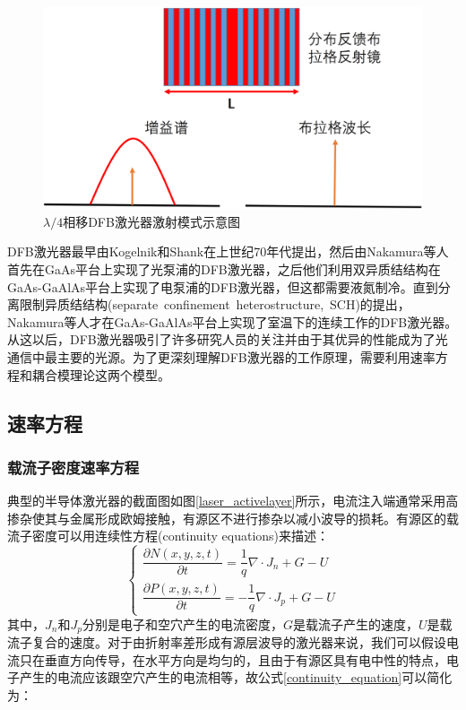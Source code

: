\begin{figure}[htb]
	\centering
	\includegraphics[width=12cm]{./Pictures/fab_dfb_laser.jpg}
	\captionsetup{justification=centering}
	\caption{$\lambda/4$相移DFB激光器激射模式示意图}
	\label{fab_dfb_laser}
\end{figure}

DFB激光器最早由Kogelnik和Shank在上世纪70年代提出\cite{kogelnik1971stimulated,kogelnik1972coupled}，然后由Nakamura等人首先在GaAs平台上实现了光泵浦的DFB激光器\cite{nakamura1973optically}，之后他们利用双异质结结构在GaAs-GaAlAs平台上实现了电泵浦的DFB激光器\cite{nakamura1974gaas}，但这都需要液氮制冷。直到分离限制异质结结构(separate~confinement~heterostructure,~SCH)的提出，Nakamura等人才在GaAs-GaAlAs平台上实现了室温下的连续工作的DFB激光器\cite{nakamura1975cw}。从这以后，DFB激光器吸引了许多研究人员的关注并由于其优异的性能成为了光通信中最主要的光源。为了更深刻理解DFB激光器的工作原理，需要利用速率方程和耦合模理论这两个模型。

\subsection{速率方程}

\subsubsection{载流子密度速率方程}
典型的半导体激光器的截面图如图\ref{laser_activelayer}所示，电流注入端通常采用高掺杂使其与金属形成欧姆接触，有源区不进行掺杂以减小波导的损耗。有源区的载流子密度可以用连续性方程(continuity equations)来描述：
\begin{equation}
\label{continuity_equation}
\left\{
\begin{array}{l}
\dfrac{\partial N(x,y,z,t)}{\partial t} = \dfrac{1}{q}\nabla\cdot J_{n}+G-U\\
\dfrac{\partial P(x,y,z,t)}{\partial t} = -\dfrac{1}{q}\nabla\cdot J_{p}+G-U
\end{array}
\right.
\end{equation}
其中，$J_{n}$和$J_{p}$分别是电子和空穴产生的电流密度，$G$是载流子产生的速度，$U$是载流子复合的速度。对于由折射率差形成有源层波导的激光器来说，我们可以假设电流只在垂直方向传导，在水平方向是均匀的，且由于有源区具有电中性的特点，电子产生的电流应该跟空穴产生的电流相等，故公式\ref{continuity_equation}可以简化为：


